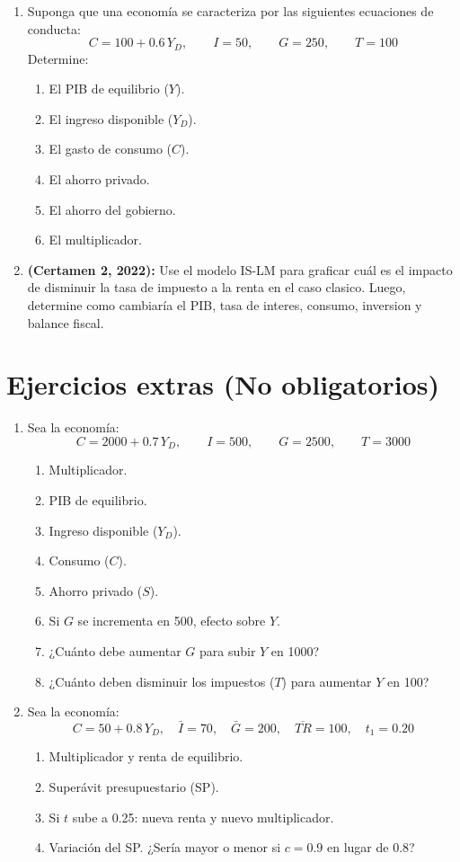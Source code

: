 \documentclass[11pt,addpoints]{article}
\begin{document}
\begin{enumerate}[label=\textbf{\arabic*.}]
\item Suponga que una economía se caracteriza por las siguientes ecuaciones de conducta:
\[
C = 100 + 0.6\,Y_D,\qquad I = 50,\qquad G = 250,\qquad T = 100
\]
Determine:
\begin{enumerate}[label=\alph*)]
\item El PIB de equilibrio ($Y$).
\item El ingreso disponible ($Y_D$).
\item El gasto de consumo ($C$).
\item El ahorro privado.
\item El ahorro del gobierno.
\item El multiplicador.
\end{enumerate}

\item \textbf{(Certamen 2, 2022):}
Use el modelo IS-LM para graficar cuál es el impacto de disminuir la tasa de impuesto a la renta en el caso clasico. Luego, determine como cambiaría el PIB, tasa de interes, consumo, inversion y balance fiscal.
\end{enumerate}

\newpage
\vspace*{0.1cm}
\section*{\textbf{Ejercicios extras (No obligatorios)}}

\begin{enumerate}[label=\textbf{\arabic*.},start=1]
\item Sea la economía:
\[
C = 2000 + 0.7\,Y_D,\qquad I = 500,\qquad G = 2500,\qquad T = 3000
\]
\begin{enumerate}[label=\alph*)]
\item Multiplicador.
\item PIB de equilibrio.
\item Ingreso disponible ($Y_D$).
\item Consumo ($C$).
\item Ahorro privado ($S$).
\item Si $G$ se incrementa en 500, efecto sobre $Y$.
\item ¿Cuánto debe aumentar $G$ para subir $Y$ en 1000?
\item ¿Cuánto deben disminuir los impuestos ($T$) para aumentar $Y$ en 100?
\end{enumerate}

\item Sea la economía:
\[
C = 50 + 0.8\,Y_D,\quad \bar I = 70,\quad \bar G = 200,\quad \overline{TR} = 100,\quad t_1 = 0.20
\]
\begin{enumerate}[label=\alph*)]
\item Multiplicador y renta de equilibrio.
\item Superávit presupuestario (SP).
\item Si $t$ sube a 0.25: nueva renta y nuevo multiplicador.
\item Variación del SP. ¿Sería mayor o menor si $c=0.9$ en lugar de $0.8$?
\end{enumerate}
\end{enumerate}
\end{document}
